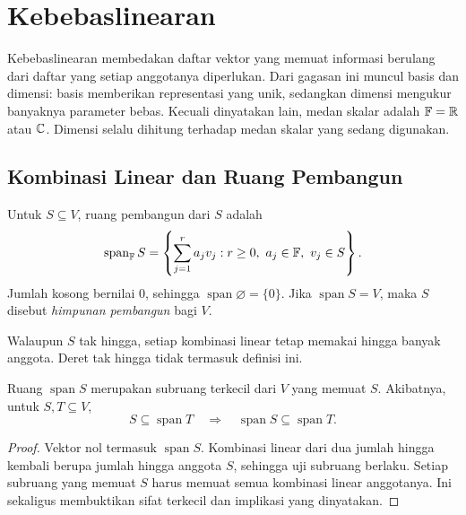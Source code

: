\chapter{Kebebaslinearan}
\label{ch:kebebaslinearan}

Kebebaslinearan membedakan daftar vektor yang memuat informasi
berulang dari daftar yang setiap anggotanya diperlukan. Dari gagasan
ini muncul basis dan dimensi: basis memberikan representasi yang
unik, sedangkan dimensi mengukur banyaknya parameter bebas.
Kecuali dinyatakan lain, medan skalar adalah $\mathbb{F}=\mathbb{R}$ atau $\mathbb{C}$.
Dimensi selalu dihitung terhadap medan skalar yang sedang digunakan.

\section{Kombinasi Linear dan Ruang Pembangun}

\begin{definisi}
    Untuk $S\subseteq V$, ruang pembangun dari $S$ adalah
    \[
        \operatorname{span}_{\mathbb{F}}S
        =\left\{\sum_{j=1}^{r}a_jv_j:
        r\ge0,\ a_j\in\mathbb{F},\ v_j\in S\right\}.
    \]
    Jumlah kosong bernilai $0$, sehingga
    $\operatorname{span}\varnothing=\{0\}$.
    Jika $\operatorname{span}S=V$, maka $S$ disebut
    \emph{himpunan pembangun} bagi $V$.
\end{definisi}

Walaupun $S$ tak hingga, setiap kombinasi linear tetap memakai
hingga banyak anggota. Deret tak hingga tidak termasuk definisi ini.

\begin{prop}
    Ruang $\operatorname{span}S$ merupakan subruang terkecil dari
    $V$ yang memuat $S$. Akibatnya, untuk $S,T\subseteq V$,
    \[
        S\subseteq\operatorname{span}T
        \quad\Longrightarrow\quad
        \operatorname{span}S\subseteq\operatorname{span}T.
    \]
\end{prop}
\begin{proof}
    Vektor nol termasuk $\operatorname{span}S$. Kombinasi linear
    dari dua jumlah hingga kembali berupa jumlah hingga anggota
    $S$, sehingga uji subruang berlaku. Setiap subruang yang memuat
    $S$ harus memuat semua kombinasi linear anggotanya. Ini sekaligus
    membuktikan sifat terkecil dan implikasi yang dinyatakan.
\end{proof}

